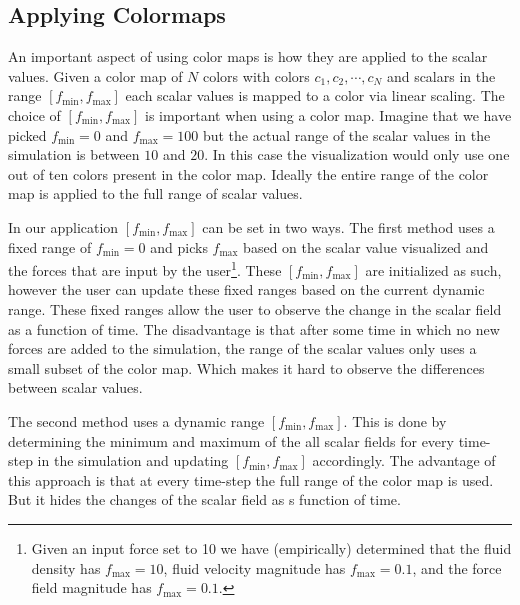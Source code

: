 \subsection{Applying Colormaps}
\label{ss:colormaps:applying}
An important aspect of using color maps is how they are applied to the scalar values. Given a color map of $N$ colors with colors $c_1,c_2,\cdots,c_N$ and scalars in the range $[f_{\text{min}}, f_{\text{max}}]$ each scalar values is mapped to a color via linear scaling. The choice of $[f_{\text{min}}, f_{\text{max}}]$ is important when using a color map. Imagine that we have picked $f_{\text{min}} = 0$ and $f_{\text{max}} = 100$ but the actual range of the scalar values in the simulation is between $10$ and $20$. In this case the visualization would only use one out of ten colors present in the color map. Ideally the entire range of the color map is applied to the full range of scalar values.

In our application $[f_{\text{min}}, f_{\text{max}}]$ can be set in two ways. The first method uses a fixed range of $f_{\text{min}} = 0$ and picks $f_{\text{max}}$ based on the scalar value visualized and the forces that are input by the user\footnote{Given an input force set to 10 we have (empirically) determined that the fluid density has $f_{\text{max}} = 10$, fluid velocity magnitude has $f_{\text{max}} = 0.1$, and the force field magnitude has $f_{\text{max}} = 0.1$.}. These $[f_{\text{min}}, f_{\text{max}}]$ are initialized as such, however the user can update these fixed ranges based on the current dynamic range. These fixed ranges allow the user to observe the change in the scalar field as a function of time. The disadvantage is that after some time in which no new forces are added to the simulation, the range of the scalar values only uses a small subset of the color map. Which makes it hard to observe the differences between scalar values.

The second method uses a dynamic range $[f_{\text{min}}, f_{\text{max}}]$. This is done by determining the minimum and maximum of the all scalar fields for every time-step in the simulation and updating $[f_{\text{min}}, f_{\text{max}}]$ accordingly. The advantage of this approach is that at every time-step the full range of the color map is used. But it hides the changes of the scalar field as s function of time.

